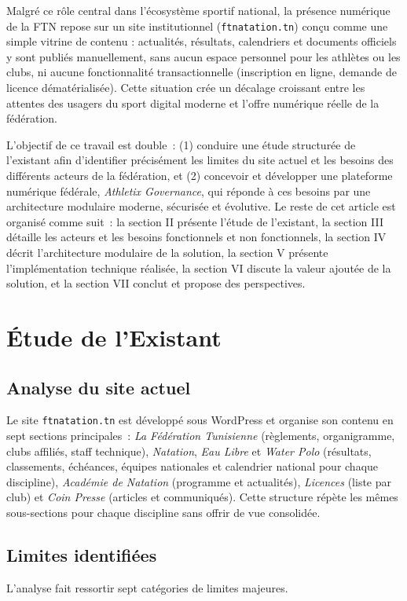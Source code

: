 \documentclass[conference]{IEEEtran}
\begin{document}
Malgré ce rôle central dans l'écosystème sportif national, la présence numérique de la FTN repose sur un site institutionnel (\texttt{ftnatation.tn}) conçu comme une simple vitrine de contenu : actualités, résultats, calendriers et documents officiels y sont publiés manuellement, sans aucun espace personnel pour les athlètes ou les clubs, ni aucune fonctionnalité transactionnelle (inscription en ligne, demande de licence dématérialisée). Cette situation crée un décalage croissant entre les attentes des usagers du sport digital moderne et l'offre numérique réelle de la fédération.

L'objectif de ce travail est double~: (1) conduire une étude structurée de l'existant afin d'identifier précisément les limites du site actuel et les besoins des différents acteurs de la fédération, et (2) concevoir et développer une plateforme numérique fédérale, \emph{Athletix Governance}, qui réponde à ces besoins par une architecture modulaire moderne, sécurisée et évolutive. Le reste de cet article est organisé comme suit~: la section II présente l'étude de l'existant, la section III détaille les acteurs et les besoins fonctionnels et non fonctionnels, la section IV décrit l'architecture modulaire de la solution, la section V présente l'implémentation technique réalisée, la section VI discute la valeur ajoutée de la solution, et la section VII conclut et propose des perspectives.

\section{Étude de l'Existant}
\subsection{Analyse du site actuel}
Le site \texttt{ftnatation.tn} est développé sous WordPress et organise son contenu en sept sections principales~: \emph{La Fédération Tunisienne} (règlements, organigramme, clubs affiliés, staff technique), \emph{Natation}, \emph{Eau Libre} et \emph{Water Polo} (résultats, classements, échéances, équipes nationales et calendrier national pour chaque discipline), \emph{Académie de Natation} (programme et actualités), \emph{Licences} (liste par club) et \emph{Coin Presse} (articles et communiqués). Cette structure répète les mêmes sous-sections pour chaque discipline sans offrir de vue consolidée.

\subsection{Limites identifiées}
L'analyse fait ressortir sept catégories de limites majeures.
\end{document}
